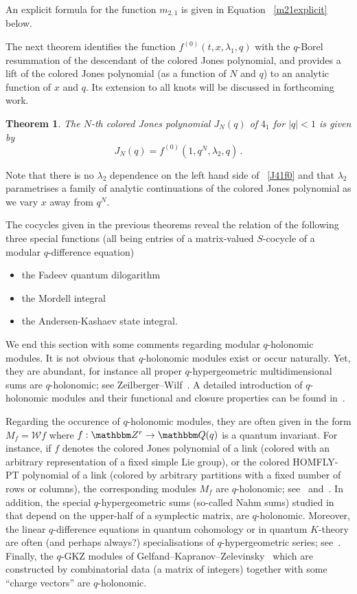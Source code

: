 \documentclass[12pt,reqno]{amsart}
\newtheorem{theorem}{Theorem}[section]
\theoremstyle{definition}
\def\BZ{\mathbbm Z}
\def\BQ{\mathbbm Q}
\def\calW{\mathcal W}
\def\be{\begin{equation}}
\def\ee{\end{equation}}
\begin{document}
An explicit formula for the function $m_{2,1}$ is given in Equation
~\eqref{m21explicit} below.

The next theorem identifies the function 
$f^{(0)}(t,x,\lambda_{1},q)$ with the $q$-Borel resummation of the descendant of
the colored Jones polynomial, and provides a lift of the colored Jones polynomial
(as a function of $N$ and $q$) to an analytic function of $x$ and $q$.  
Its extension to all knots will be discussed in forthcoming work. 

\begin{theorem}
  \label{thm.CJ41lift}
  The $N$-th colored Jones polynomial $J_{N}(q)$ of $4_{1}$ for $|q|<1$ is given by
  \be
  \label{J41f0}
J_{N}(q)=f^{(0)}(1,q^{N},\lambda_{2},q) \,.
  \ee
\end{theorem}
Note that there is no $\lambda_{2}$ dependence on the left hand side of
~\eqref{J41f0} and that $\lambda_{2}$ parametrises a family of analytic
continuations of the colored Jones polynomial as we vary $x$ away from $q^{N}$.

The cocycles given in the previous theorems reveal the relation of the
following three special functions (all being entries of a matrix-valued
$S$-cocycle of a modular $q$-difference equation)
  \begin{itemize}
\item[(a)] the Fadeev quantum dilogarithm
\item[(b)] the Mordell integral
\item[(c)] the Andersen-Kashaev state integral. 
\end{itemize}

We end this section with some comments regarding modular $q$-holonomic modules.
It is not obvious that $q$-holonomic modules exist or occur naturally. Yet,
they are abundant, for instance all proper $q$-hypergeometric multidimensional
sums are $q$-holonomic; see  Zeilberger--Wilf~\cite{WZ}. A detailed introduction
of $q$-holonomic modules and their functional and closure properties can be found
in~\cite{GL:survey,Koutschan:HF,PWZ}. 

Regarding the occurence of $q$-holonomic modules, they are often given in the form
$M_f=\calW f$ where $f: \BZ^r \to \BQ(q)$ is a quantum invariant. For instance,
if $f$ denotes the colored Jones polynomial of a link (colored with an arbitrary
representation of a fixed simple Lie group), or the colored HOMFLY-PT polynomial
of a link (colored by arbitrary partitions with a fixed number of rows or columns),
the corresponding modules $M_f$ are $q$-holonomic; see~\cite{GL} and~\cite{GLL}.
In addition, the special $q$-hypergeometric sums (so-called Nahm sums) studied
in~\cite[Sec.4.7]{GZ:kashaev} that depend on the upper-half of a symplectic matrix,
are $q$-holonomic. Moreover, the linear $q$-difference equations in quantum cohomology
or in quantum $K$-theory are often (and perhaps always?) specialisations of
$q$-hypergeometric series; see~\cite{OP,GS:quintic,Iritani:rec,Wen}.
Finally, the $q$-GKZ modules of Gelfand--Kapranov--Zelevinsky~\cite{Gelfand3,Gelfand2,
  Gelfand1} which are constructed by combinatorial data (a matrix of integers) together
with some ``charge vectors'' are $q$-holonomic.
\end{document}
